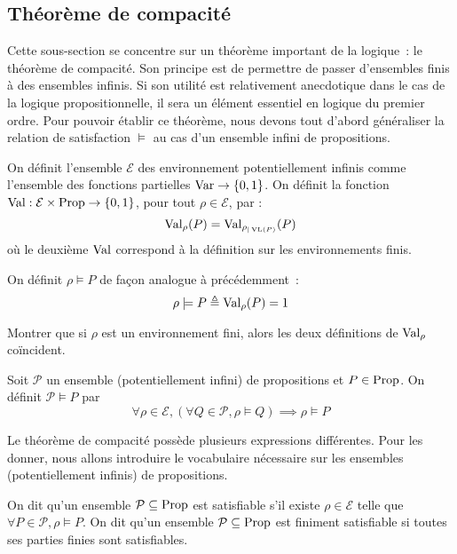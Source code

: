 \subsection{Théorème de compacité}

Cette sous-section se concentre sur un théorème important de la logique~: le
théorème de compacité. Son principe est de permettre de passer d'ensembles finis
à des ensembles infinis. Si son utilité est relativement anecdotique dans le cas
de la logique propositionnelle, il sera un élément essentiel en logique du
premier ordre. Pour pouvoir établir ce théorème, nous devons tout d'abord
généraliser la relation de satisfaction $\vDash$ au cas d'un ensemble infini de
propositions.

\begin{definition}
  On définit l'ensemble $\mathcal E$ des environnement potentiellement infinis
  comme l'ensemble des fonctions partielles $\operatorname{Var} \to \{0,1\}$. On définit la
  fonction $\operatorname{Val} : \mathcal E\times \operatorname{Prop} \to \{0,1\}$, pour tout
  $\rho\in\mathcal E$, par :
  \[\operatorname{Val}_\rho(P) = \operatorname{Val}_{\rho_{|\operatorname{VL}(P)}}(P)\]
  où le deuxième $\operatorname{Val}$ correspond à la définition sur les environnements finis.

  On définit $\rho\models P$ de façon analogue à précédemment~:
  \[\rho\models P \triangleq \operatorname{Val}_\rho(P) = 1\]
\end{definition}

\begin{exercise}
  Montrer que si $\rho$ est un environnement fini, alors les deux définitions de
  $\operatorname{Val}_\rho$ coïncident.
\end{exercise}

\begin{definition}
  Soit $\mathcal P$ un ensemble (potentiellement infini) de propositions et
  $P\in\operatorname{Prop}$. On définit $\mathcal P\vDash P$ par
  \[\forall \rho\in\mathcal E, (\forall Q \in\mathcal P, \rho\models Q)
  \implies \rho\models P\]
\end{definition}

Le théorème de compacité possède plusieurs expressions différentes. Pour les
donner, nous allons introduire le vocabulaire nécessaire sur les ensembles
(potentiellement infinis) de propositions.

\begin{definition}[Satisfiabilité]
  On dit qu'un ensemble $\mathcal P\subseteq\operatorname{Prop}$ est satisfiable s'il existe
  $\rho\in\mathcal E$ telle que $\forall P\in\mathcal P, \rho\models P$. On dit
  qu'un ensemble $\mathcal P\subseteq\operatorname{Prop}$ est finiment satisfiable si toutes
  ses parties finies sont satisfiables.
\end{definition}


